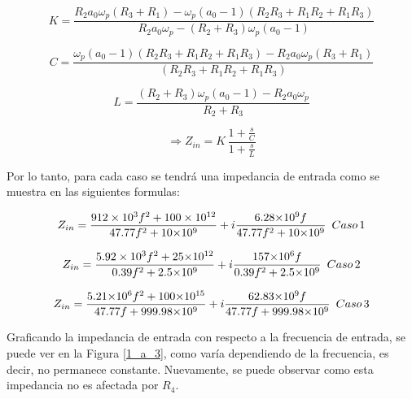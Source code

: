 \[
K=\frac{R_{2}a_{0}\omega_{p}(R_{3}+R_{1})-\omega_{p}(a_{0}-1)\left(R_{2}R_{3}+R_{1}R_{2}+R_{1}R_{3}\right)}{R_{2}a_{0}\omega_{p}-\left(R_{2}+R_{3}\right)\omega_{p}\left(a_{0}-1\right)}
\]

\[
C=\frac{\omega_{p}(a_{0}-1)\left(R_{2}R_{3}+R_{1}R_{2}+R_{1}R_{3}\right)-R_{2}a_{0}\omega_{p}\left(R_{3}+R_{1}\right)}{\left(R_{2}R_{3}+R_{1}R_{2}+R_{1}R_{3}\right)}
\]

\[
L=\frac{\left(R_{2}+R_{3}\right)\omega_{p}\left(a_{0}-1\right)-R_{2}a_{0}\omega_{p}}{R_{2}+R_{3}}
\]

\begin{equation}
\Rightarrow Z_{in}=K\,\frac{1+\frac{s}{C}}{1+\frac{s}{L}}\label{eq:1_a_2}
\end{equation}

Por lo tanto, para cada caso se tendrá una impedancia de entrada como
se muestra en las siguientes formulas:

\[
Z_{in}=\frac{912\times10^{3}f^{2}+100\times10^{12}}{47.77f^{2}+10\text{\texttimes}10^{9}}+i\frac{6.28\text{\texttimes}10^{9}f}{47.77f^{2}+10\text{\texttimes}10^{9}}\,\,\,Caso\,1
\]

\[
Z_{in}=\frac{5.92\times10^{3}f^{2}+25\text{\texttimes}10^{12}}{0.39f^{2}+2.5\text{\texttimes}10^{9}}+i\frac{157\text{\texttimes}10^{6}f}{0.39f^{2}+2.5\text{\texttimes}10^{9}}\,\,\,Caso\,2
\]

\[
Z_{in}=\frac{5.21\text{\texttimes}10^{6}f^{2}+100\text{\texttimes}10^{15}}{47.77f+999.98\text{\texttimes}10^{9}}+i\frac{62.83\text{\texttimes}10^{9}f}{47.77f+999.98\text{\texttimes}10^{9}}\,\,\,Caso\,3
\]

Graficando la impedancia de entrada con respecto a la frecuencia de
entrada, se puede ver en la Figura \ref{1_a_3}, como varía dependiendo
de la frecuencia, es decir, no permanece constante. Nuevamente, se
puede observar como esta impedancia no es afectada por $R_{4}$.

